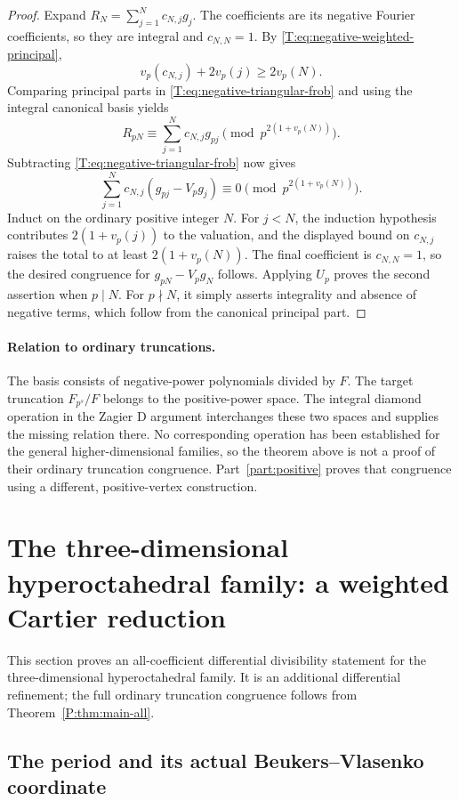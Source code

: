 \documentclass[11pt,a4paper]{article}
\theoremstyle{definition}\newtheorem{definition}[theorem]{Definition}
\theoremstyle{remark}\newtheorem{remark}[theorem]{Remark}
\numberwithin{equation}{section}
\begin{document}
\begin{proof}
Expand \(R_N=\sum_{j=1}^Nc_{N,j}g_j\).
The coefficients are its negative Fourier coefficients, so they are
integral and \(c_{N,N}=1\).
By \eqref{T:eq:negative-weighted-principal},
\[
 v_p(c_{N,j})+2v_p(j)\geq2v_p(N).
\]
Comparing principal parts in \eqref{T:eq:negative-triangular-frob}
and using the integral canonical basis yields
\[
 R_{pN}\equiv\sum_{j=1}^Nc_{N,j}g_{pj}
 \pmod{p^{2(1+v_p(N))}}.
\]
Subtracting \eqref{T:eq:negative-triangular-frob} now gives
\[
 \sum_{j=1}^Nc_{N,j}(g_{pj}-V_pg_j)
 \equiv0\pmod{p^{2(1+v_p(N))}}.
\]
Induct on the ordinary positive integer \(N\).
For \(j<N\), the induction hypothesis contributes
\(2(1+v_p(j))\) to the valuation, and the displayed bound on
\(c_{N,j}\) raises the total to at least \(2(1+v_p(N))\).
The final coefficient is \(c_{N,N}=1\), so the desired
congruence for \(g_{pN}-V_pg_N\) follows.
Applying \(U_p\) proves the second assertion when \(p\mid N\).
For \(p\nmid N\), it simply asserts integrality and absence of
negative terms, which follow from the canonical principal part.
\end{proof}

\paragraph{Relation to ordinary truncations.}
The basis consists of negative-power polynomials divided by \(F\).
The target truncation \(F_{p^s}/F\) belongs to the positive-power
space.  The integral diamond operation in the Zagier D argument
interchanges these two spaces and supplies the missing relation there.
No corresponding operation has been established for the general
higher-dimensional families, so the theorem above is not a proof of
their ordinary truncation congruence. Part~\ref{part:positive} proves that congruence using a different, positive-vertex construction.

\section{The three-dimensional hyperoctahedral family: a weighted Cartier reduction}\label{T:source-main-5}
\label{T:sec:octa-weighted}

This section proves an all-coefficient differential divisibility statement
for the three-dimensional hyperoctahedral family. It is an additional differential refinement; the full ordinary truncation congruence follows from Theorem~\ref{P:thm:main-all}.

\subsection{The period and its actual Beukers--Vlasenko coordinate}
\end{document}
